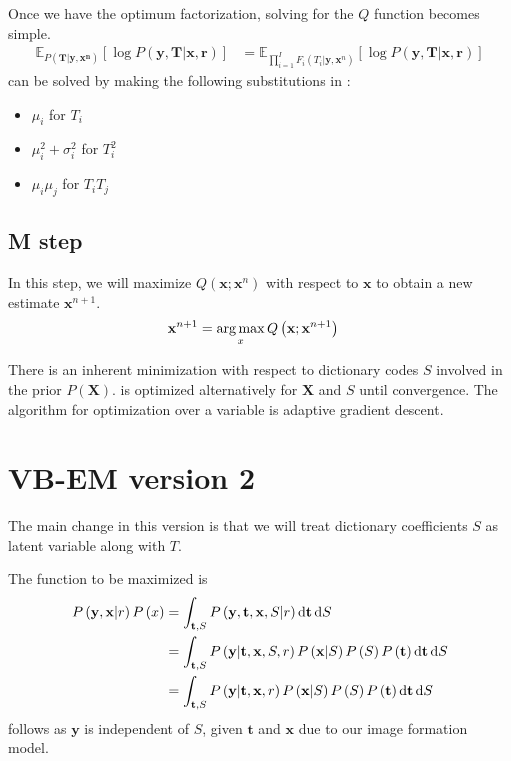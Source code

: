 Once we have the optimum factorization, solving for the $Q$ function becomes simple.
\begin{align}
    \mathbb{E}_{P( \mathbf{T} | \mathbf{y}, \mathbf{x^n})} \left[ \log P \left( \mathbf{y}, \mathbf{T} | \mathbf{x}, \mathbf{r} \right) \right] &= \mathbb{E}_{ \prod_{i=1}^{I} F_i (T_i | \mathbf{y}, \mathbf{x}^n) } \left[ \log P \left( \mathbf{y}, \mathbf{T} | \mathbf{x}, \mathbf{r} \right) \right] \label{eqn:Qsimplevbem1}
\end{align}
 can be solved by making the following substitutions in :
\begin{itemize}
    \item $\mu_i$ for $T_i$
    \item $\mu_i^2 + \sigma_i^2$ for $T_i^2$
    \item $\mu_i \mu_j$ for $T_i T_j$ 
\end{itemize}


\subsection{M step}
In this step, we will maximize $Q(\mathbf{x}; \mathbf{x}^n)$ with respect to $\mathbf{x}$ to obtain a new estimate $\mathbf{x}^{n+1}$.
\begin{align}
    \mathbf{x}^{n+1} &= \operatorname*{arg\,max}_{x} Q \left( \mathbf{x}; \mathbf{x}^{n+1} \right) \label{eqn:Mvbem1}
\end{align}

There is an inherent minimization with respect to dictionary codes $S$ involved in the prior $ P \left(\mathbf{X}\right) $.  is optimized alternatively for $\mathbf{X}$ and $S$ until convergence. The algorithm for optimization over a variable is adaptive gradient descent.

\section{VB-EM version 2}
The main change in this version is that we will treat dictionary coefficients $S$ as latent variable along with $T$.

The function to be maximized is
\begin{align}
    P \left( \mathbf{y}, \mathbf{x} | r \right) P \left( x \right) &= \int_{\mathbf{t}, S} P \left( \mathbf{y}, \mathbf{t}, \mathbf{x}, S | r \right)  \mathop{}\!\mathrm{d}\mathbf{t} \mathop{}\!\mathrm{d} S \\
    &= \int_{\mathbf{t}, S} P \left( \mathbf{y} | \mathbf{t}, \mathbf{x}, S,  r \right)  P \left(\mathbf{x} | S \right) P \left( S\right) P \left( \mathbf{t} \right) \mathop{}\!\mathrm{d}\mathbf{t} \mathop{}\!\mathrm{d} S \label{eqn:mapDerive1}\\
    &= \int_{\mathbf{t}, S} P \left( \mathbf{y} | \mathbf{t}, \mathbf{x},  r \right)  P \left(\mathbf{x} | S \right) P \left( S\right) P \left( \mathbf{t} \right) \mathop{}\!\mathrm{d}\mathbf{t} \mathop{}\!\mathrm{d} S \label{eqn:mapDerive2}
\end{align}
 follows as $\mathbf{y}$ is independent of $S$, given $\mathbf{t}$ and $\mathbf{x}$ due to our image formation model.

